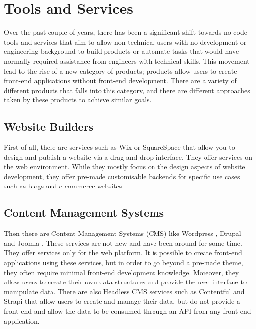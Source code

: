 \section{Tools and Services} \label{relatedTools}

Over the past couple of years, there has been a significant shift towards no-code tools and services that aim to allow non-technical users with no development or engineering background to build products or automate tasks that would have normally required assistance from engineers with technical skills. This movement lead to the rise of a new category of products; products allow users to create front-end applications without front-end development. There are a variety of different products that falls into this category, and there are different approaches taken by these products to achieve similar goals.

\subsection{Website Builders}

First of all, there are services such as Wix \cite{Wix} or SquareSpace \cite{SquareSpace} that allow you to design and publish a website via a drag and drop interface. They offer services on the web environment. While they mostly focus on the design aspects of website development, they offer pre-made customisable backends for specific use cases such as blogs and e-commerce websites.

\subsection{Content Management Systems}

Then there are Content Management Systems (CMS) like Wordpress \cite{Wordpress}, Drupal \cite{Drupal} and Joomla \cite{Joomla}. These services are not new and have been around for some time. They offer services only for the web platform. It is possible to create front-end applications using these services, but in order to go beyond a pre-made theme, they often require minimal front-end development knowledge. Moreover, they allow users to create their own data structures and provide the user interface to manipulate data. There are also Headless CMS services such as Contentful \cite{Contentful} and Strapi \cite{Strapi} that allow users to create and manage their data, but do not provide a front-end and allow the data to be consumed through an API from any front-end application.

